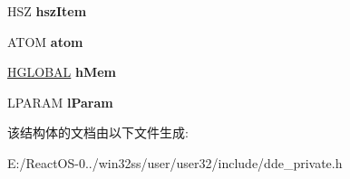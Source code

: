 \begin{DoxyCompactItemize}
\mbox{\label{structtag_w_d_m_l___x_a_c_t_a4400467d927fd8c488f34d6d9656c7ef}} 
H\+SZ {\bfseries hsz\+Item}
\item 
\mbox{\label{structtag_w_d_m_l___x_a_c_t_aef9dcbf0eb9021a58e00b28a72347dd2}} 
A\+T\+OM {\bfseries atom}
\item 
\mbox{\label{structtag_w_d_m_l___x_a_c_t_aacf356905de5fc966ed700280b4f0750}} 
\hyperlink{interfacevoid}{H\+G\+L\+O\+B\+AL} {\bfseries h\+Mem}
\item 
\mbox{\label{structtag_w_d_m_l___x_a_c_t_a97a3b17e18669949fa57efaecc548d37}} 
L\+P\+A\+R\+AM {\bfseries l\+Param}
\end{DoxyCompactItemize}


该结构体的文档由以下文件生成\+:\begin{DoxyCompactItemize}
\item 
E\+:/\+React\+O\+S-\/0../win32ss/user/user32/include/dde\+\_\+private.\+h\end{DoxyCompactItemize}
